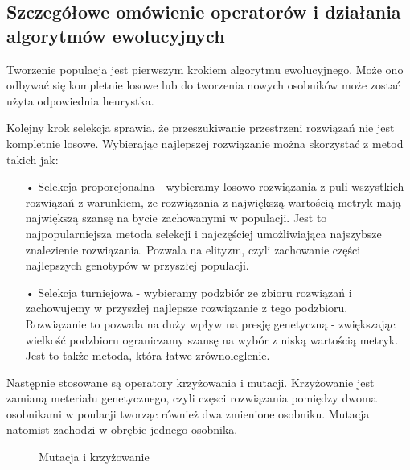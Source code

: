 \subsection{Szczegółowe omówienie operatorów i działania algorytmów ewolucyjnych}
Tworzenie populacja jest pierwszym krokiem algorytmu ewolucyjnego. Może ono odbywać się kompletnie losowe lub do tworzenia nowych osobników może zostać użyta odpowiednia heurystka. 

Kolejny krok selekcja sprawia, że przeszukiwanie przestrzeni rozwiązań nie jest kompletnie losowe. Wybierając najlepszej rozwiązanie można skorzystać z metod takich jak:
\begin{itemize}
  \item[•] Selekcja proporcjonalna - wybieramy losowo rozwiązania z puli wszystkich rozwiązań z warunkiem, że rozwiązania z największą wartością metryk mają największą szansę na bycie zachowanymi w populacji. Jest to najpopularniejsza metoda selekcji i najczęściej umożliwiająca najszybsze znalezienie rozwiązania. Pozwala na elityzm, czyli zachowanie części najlepszych genotypów w przyszłej populacji.
  \item[•] Selekcja turniejowa - wybieramy podzbiór ze zbioru rozwiązań i zachowujemy w przyszłej najlepsze rozwiązanie z tego podzbioru.
Rozwiązanie to pozwala na duży wpływ na presję genetyczną - zwiększając wielkość podzbioru ograniczamy szansę na wybór z niską wartością metryk.  Jest to także metoda, która łatwe zrównoleglenie.
\end{itemize}

Następnie stosowane są operatory krzyżowania i mutacji. Krzyżowanie jest zamianą meteriału genetycznego, czyli częsci rozwiązania pomiędzy dwoma osobnikami w poulacji tworząc również dwa zmienione osobniku. Mutacja natomist zachodzi w obrębie jednego osobnika.

\begin{figure}[h]
	\caption{\label{fig:mutation-and-crossover-operations}Mutacja i krzyżowanie}
\end{figure}

